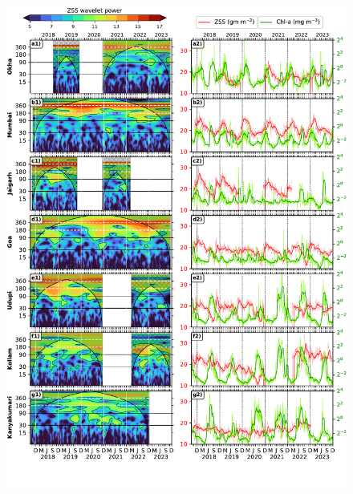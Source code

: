 \documentclass[authoryear,review,11pt]{elsarticle}
\providecommand{\DIFaddbeginFL}{} %
\providecommand{\DIFaddendFL}{} %
\providecommand{\DIFdelbeginFL}{} %
\providecommand{\DIFdelendFL}{} %
\begin{document}
\begin{figure}[htbp]
	\centering
	\DIFdelbeginFL %
\DIFdelendFL \DIFaddbeginFL \includegraphics[width=\textwidth]{./fig_07_wavelet_ss_chl_time_series.pdf} 
	\DIFaddendFL \captionsetup{justification=justified,font=footnotesize,skip=0.05\baselineskip,width=\textwidth}

\end{figure}
\end{document}
